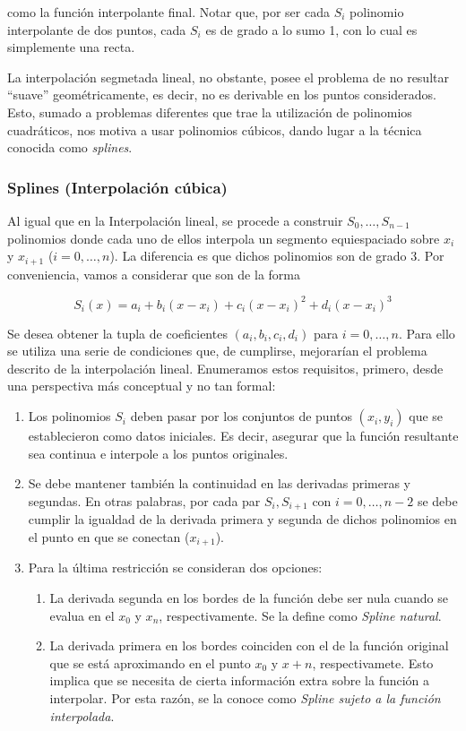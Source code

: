 como la función interpolante final. Notar que, por ser cada $S_i$ polinomio interpolante de dos puntos, cada $S_i$ es de grado a lo sumo 1, con lo cual es simplemente una recta.

La interpolación segmetada lineal, no obstante, posee el problema de no resultar ``suave'' geométricamente, es decir, no es derivable en los puntos considerados. Esto, sumado a problemas diferentes que trae la utilización de polinomios cuadráticos, nos motiva a usar polinomios cúbicos, dando lugar a la técnica conocida como \emph{splines}.

\subsubsection{Splines (Interpolaci\'on c\'ubica)}\label{sec:splines}

Al igual que en la Interpolaci\'on lineal, se procede a construir $S_0, \ldots, S_{n - 1}$ polinomios donde cada uno de ellos interpola un segmento equiespaciado sobre $x_i$ y $x_{i + 1}$ ($i = 0, \ldots, n$). La diferencia es que dichos polinomios son de grado 3. Por conveniencia, vamos a considerar que son de la forma

\[S_i(x) = a_i + b_i (x - x_i) + c_i (x - x_i)^2 + d_i (x - x_i)^3\]

Se desea obtener la tupla de coeficientes $(a_i,b_i,c_i,d_i)$ para $i = 0, \ldots, n$. Para ello se utiliza una serie de condiciones que, de cumplirse, mejorarían el problema descrito de la interpolación lineal. Enumeramos estos requisitos, primero, desde una perspectiva m\'as conceptual y no tan formal:

\begin{enumerate}
	\item Los polinomios $S_i$ deben pasar por los conjuntos de puntos $(x_i,y_i)$ que se establecieron como datos iniciales. Es decir, asegurar que la funci\'on resultante sea continua e interpole a los puntos originales.
	\item Se debe mantener tambi\'en la continuidad en las derivadas primeras y segundas. En otras palabras, por cada par $S_i, S_{i + 1}$ con $i = 0, \ldots, n-2$ se debe cumplir la igualdad de la derivada primera y segunda de dichos polinomios en el punto en que se conectan ($x_{i + 1}$).
	\item Para la \'ultima restricci\'on se consideran dos opciones:
		\begin{enumerate}
			\item La derivada segunda en los bordes de la funci\'on debe ser nula cuando se evalua en el $x_0$ y $x_n$, respectivamente. Se la define como \textit{Spline natural}.
			\item La derivada primera en los bordes coinciden con el de la funci\'on original que se est\'a aproximando en el punto $x_0$ y $x+n$, respectivamete. Esto implica que se necesita de cierta informaci\'on extra sobre la funci\'on a interpolar. Por esta raz\'on, se la conoce como \textit{Spline sujeto a la funci\'on interpolada}.  
		\end{enumerate}
\end{enumerate}

